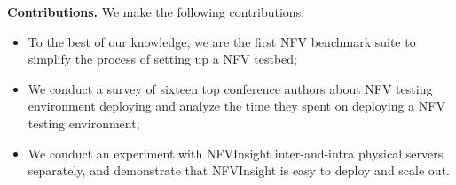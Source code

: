 \textbf{Contributions.} We make the following contributions:
\begin{itemize}
\item
To the best of our knowledge, we are the first NFV benchmark suite to simplify the process of
setting up a NFV testbed;
\item
We conduct a survey of sixteen top conference authors about NFV testing environment deploying and analyze the time they spent on deploying a NFV testing environment;
\item
We conduct an experiment with NFVInsight inter-and-intra physical servers separately, and demonstrate that NFVInsight is easy to deploy and scale out. 
\end{itemize}


%
%
